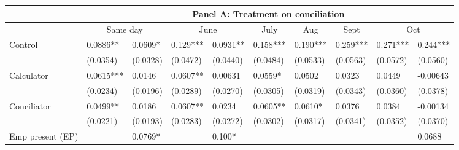 \begin{tabular}{rrrrrrrrrr}
\toprule
      & \multicolumn{9}{c}{Panel A: Treatment on conciliation} \\
\midrule
      & \multicolumn{2}{c}{Same day} & \multicolumn{2}{c}{June} & \multicolumn{1}{c}{July } & \multicolumn{1}{c}{Aug} & \multicolumn{1}{c}{Sept} & \multicolumn{2}{c}{Oct} \\
      \midrule
\multicolumn{1}{l}{Control} & \multicolumn{1}{l}{0.0886**} & \multicolumn{1}{l}{0.0609*} & \multicolumn{1}{l}{0.129***} & \multicolumn{1}{l}{0.0931**} & \multicolumn{1}{l}{0.158***} & \multicolumn{1}{l}{0.190***} & \multicolumn{1}{l}{0.259***} & \multicolumn{1}{l}{0.271***} & \multicolumn{1}{l}{0.244***} \\
\multicolumn{1}{l}{} & \multicolumn{1}{l}{(0.0354)} & \multicolumn{1}{l}{(0.0328)} & \multicolumn{1}{l}{(0.0472)} & \multicolumn{1}{l}{(0.0440)} & \multicolumn{1}{l}{(0.0484)} & \multicolumn{1}{l}{(0.0533)} & \multicolumn{1}{l}{(0.0563)} & \multicolumn{1}{l}{(0.0572)} & \multicolumn{1}{l}{(0.0560)} \\
\multicolumn{1}{l}{Calculator} & \multicolumn{1}{l}{0.0615***} & \multicolumn{1}{l}{0.0146} & \multicolumn{1}{l}{0.0607**} & \multicolumn{1}{l}{0.00631} & \multicolumn{1}{l}{0.0559*} & \multicolumn{1}{l}{0.0502} & \multicolumn{1}{l}{0.0323} & \multicolumn{1}{l}{0.0449} & \multicolumn{1}{l}{-0.00643} \\
\multicolumn{1}{l}{} & \multicolumn{1}{l}{(0.0234)} & \multicolumn{1}{l}{(0.0196)} & \multicolumn{1}{l}{(0.0289)} & \multicolumn{1}{l}{(0.0270)} & \multicolumn{1}{l}{(0.0305)} & \multicolumn{1}{l}{(0.0319)} & \multicolumn{1}{l}{(0.0343)} & \multicolumn{1}{l}{(0.0360)} & \multicolumn{1}{l}{(0.0378)} \\
\multicolumn{1}{l}{Conciliator} & \multicolumn{1}{l}{0.0499**} & \multicolumn{1}{l}{0.0186} & \multicolumn{1}{l}{0.0607**} & \multicolumn{1}{l}{0.0234} & \multicolumn{1}{l}{0.0605**} & \multicolumn{1}{l}{0.0610*} & \multicolumn{1}{l}{0.0376} & \multicolumn{1}{l}{0.0384} & \multicolumn{1}{l}{-0.00134} \\
\multicolumn{1}{l}{} & \multicolumn{1}{l}{(0.0221)} & \multicolumn{1}{l}{(0.0193)} & \multicolumn{1}{l}{(0.0283)} & \multicolumn{1}{l}{(0.0272)} & \multicolumn{1}{l}{(0.0302)} & \multicolumn{1}{l}{(0.0317)} & \multicolumn{1}{l}{(0.0341)} & \multicolumn{1}{l}{(0.0352)} & \multicolumn{1}{l}{(0.0370)} \\
\multicolumn{1}{l}{Emp present (EP)} & \multicolumn{1}{l}{} & \multicolumn{1}{l}{0.0769*} & \multicolumn{1}{l}{} & \multicolumn{1}{l}{0.100*} & \multicolumn{1}{l}{} & \multicolumn{1}{l}{} & \multicolumn{1}{l}{} & \multicolumn{1}{l}{} & \multicolumn{1}{l}{0.0688} \\

\end{tabular}
